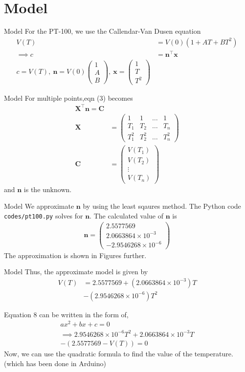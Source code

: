 \documentclass{beamer}
\providecommand{\brak}[1]{\ensuremath{\left(#1\right)}}
\theoremstyle{remark}
\newcommand{\myvec}[1]{\ensuremath{\begin{pmatrix}#1\end{pmatrix}}}
\renewcommand{\vec}[1]{\mathbf{\boldsymbol{#1}}}
\begin{document}
\section{Model}
\begin{frame}{Model}
For the PT-100, we use the Callendar-Van Dusen equation
\begin{align}
    V(T) &= V(0)\brak{1+AT+BT^2} \\
    \implies c &= \vec{n}^\top\vec{x}\\
    c = V(T),\ \vec{n} = V(0)\myvec{1\\A\\B},\ \vec{x} = \myvec{1\\T\\T^2}
\end{align}
\end{frame}
\begin{frame}{Model}
For multiple points,eqn (3) becomes
   \begin{align}
    \vec{X}^\top\vec{n} = \vec{C}\\
    \vec{X} &= \myvec{1&1&\ldots&1\\T_1&T_2&\ldots&T_n\\T_1^2&T_2^2&\ldots&T_n^2} \\
    \vec{C} &= \myvec{V\brak{T_1}\\V\brak{T_2}\\\vdots\\V\brak{T_n}}
      \end{align}
and $\vec{n}$ is the unknown.
\end{frame}
\begin{frame}{Model}
We approximate $\vec{n}$ by using the least sqaures method. The Python code 
\texttt{codes/pt100.py} solves for $\vec{n}$.
The calculated value of $\vec{n}$ is
\begin{align}
    \vec{n} = \myvec{2.5577569\\2.0663864\times10^{-3}\\-2.9546268\times10^{-6}}
\end{align}
The approximation is shown in Figures further.
\end{frame}
\begin{frame}{Model}
Thus, the approximate model is given by
\begin{align}
    V(T) &= 2.5577569 + \brak{2.0663864\times10^{-3}}T \nonumber \\
         &- \brak{2.9546268\times10^{-6}}T^2 
\end{align}

Equation 8 can be written in the form of,
\begin{align}
ax^2 + bx + c=0\\
\implies 2.9546268\times10^{-6}T^2 + 2.0663864\times10^{-3}T \nonumber \\
- \brak{2.5577569 - V(T)} = 0 
\end{align}  
Now, we can use the quadratic formula to find the value of the temperature.(which has been done in Arduino)
\end{frame}
\end{document}
